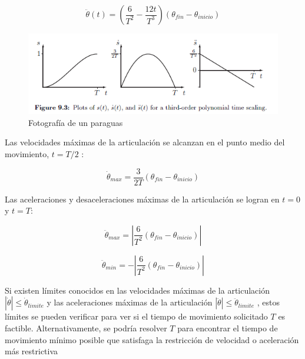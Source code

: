             \begin{equation}
                \ddot{\theta}(t)= \left(  \frac{6}{T^2}-\frac{12t}{T^3} \right) (\theta_{fin}-\theta_{inicio})
                \label{eq:cap4_tray_24}
             \end{equation} 
             
             \begin{figure}[htb]
                \centering
                \includegraphics[width=0.8\linewidth]{Main/Chapter4/Images4/cap4_tray_8.png}
                \caption{Fotografía de un paraguas}
                \label{f:Cap4_tray_8}
            \end{figure}  
             
             
        Las velocidades máximas de la articulación se alcanzan en el punto medio del movimiento, $t = T/2$ : 
        
            \begin{equation}
                  {\dot{\theta}}_{max}= \frac{3}{2T} (\theta_{fin}-\theta_{inicio})
                \label{eq:cap4_tray_25}
             \end{equation} 

        Las aceleraciones y desaceleraciones máximas de la articulación se logran en $t = 0$ y $t = T$:
        
            \begin{equation}
                  {\ddot{\theta}}_{max}= \left | { \frac{6}{T^2} (\theta_{fin}-\theta_{inicio})} \right|
                \label{eq:cap4_tray_26}
             \end{equation} 
        
            \begin{equation}
                  {\ddot{\theta}}_{min}= -\left | { \frac{6}{T^2} (\theta_{fin}-\theta_{inicio})} \right|
                \label{eq:cap4_tray_27}
             \end{equation} 
             
        Si existen límites conocidos en las velocidades máximas de la articulación $\left|\dot{\theta} \right|  \leq  {\dot{\theta}}_{limite} $  y las aceleraciones máximas de la articulación  $\left|\ddot{\theta} \right|  \leq  {\ddot{\theta}}_{limite} $ , estos límites se pueden verificar para ver si el tiempo de movimiento solicitado $T$ es factible. Alternativamente, se podría resolver $T$ para encontrar el tiempo de movimiento mínimo posible que satisfaga la restricción de velocidad o aceleración más restrictiva
        
